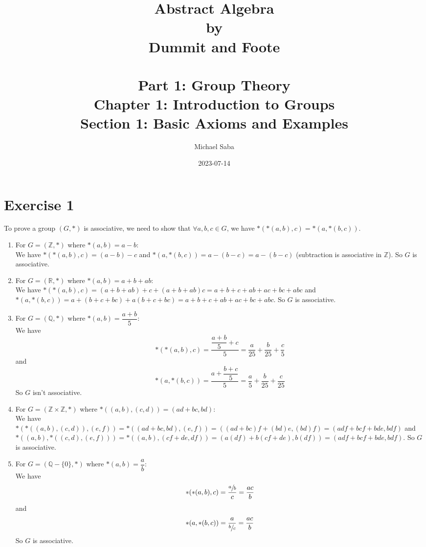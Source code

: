 \documentclass[12pt]{article}
\title{%
    \Huge Abstract Algebra \\
    \large by \\
    \Large Dummit and Foote \\~\\
    \huge Part 1: Group Theory \\
    \LARGE Chapter 1: Introduction to Groups \\
    \Large Section 1: Basic Axioms and Examples
}
\date{2023-07-14}
\author{Michael Saba}
\newcommand{\Z}{\mathbb{Z}}
\newcommand{\Q}{\mathbb{Q}}
\newcommand{\R}{\mathbb{R}}
\begin{document}
    \maketitle
    \newpage


    \section*{Exercise 1}
    To prove a group $(G, \ast)$ is associative,
    we need to show that $ \forall a, b, c \in G$,
    we have $\ast(\ast(a, b), c) = \ast(a, \ast(b, c))$.
    \begin{enumerate}[label=\textbf{\alph*.}]
        \item
            For $G = (\Z, \ast)$ where $\ast(a, b) = a - b$: \\
            We have $\ast(\ast(a, b), c) = (a - b) - c$
            and $\ast(a, \ast(b, c)) = a - (b - c) = a - (b - c)$
            (subtraction is associative in $\Z$).
            So $G$ is associative. 
        \item
            For $G = (\R, \ast)$ where $\ast(a, b) = a + b + ab$: \\
            We have $\ast(\ast(a, b), c)
            = (a + b + ab) + c + (a + b + ab)c
            = a + b + c + ab + ac + bc + abc$
            and $\ast(a, \ast(b, c))
            = a + (b + c + bc) + a(b + c + bc)
            = a + b + c + ab + ac + bc + abc$.
            So $G$ is associative.
        \item
            For $G = (\Q, \ast)$ where $\ast(a, b) = \dfrac{a+b}{5}$: \\
            We have \[\ast(\ast(a, b), c)
            = \dfrac{\dfrac{a + b}{5} + c}{5}
            = \dfrac{a}{25} + \dfrac{b}{25} + \dfrac{c}{5}\]
            and \[\ast(a, \ast(b, c))
            = \dfrac{a + \dfrac{b + c}{5}}{5}
            = \dfrac{a}{5} + \dfrac{b}{25} + \dfrac{c}{25}\]
            So $G$ isn't associative.
        \item
            For $G = (\Z \times \Z, \ast)$
            where $\ast((a, b), (c, d)) = (ad + bc, bd)$: \\
            We have $\ast(\ast((a, b), (c, d)), (e, f)) 
            = \ast((ad + bc, bd), (e, f)) 
            = ((ad + bc)f + (bd)e, (bd)f) = (adf + bcf + bde, bdf)$
            and $\ast((a, b), \ast((c, d), (e, f)))
            = \ast((a, b), (cf + de, df)) 
            = (a(df) + b(cf + de), b(df)) 
            = (adf + bcf + bde, bdf)$.
            So $G$ is associative.
        \item
            For $G = (\Q - \{0\}, \ast)$ where $\ast(a, b) = \dfrac{a}{b}$: \\
            We have \[\ast(\ast(a, b), c)
            = \dfrac{\sfrac{a}{b}}{c} = \dfrac{ac}{b}\]
            and \[\ast(a, \ast(b, c))
            = \dfrac{a}{\sfrac{b}{c}} = \dfrac{ac}{b}\]
            So $G$ is associative.
    \end{enumerate}
   
\end{document}
